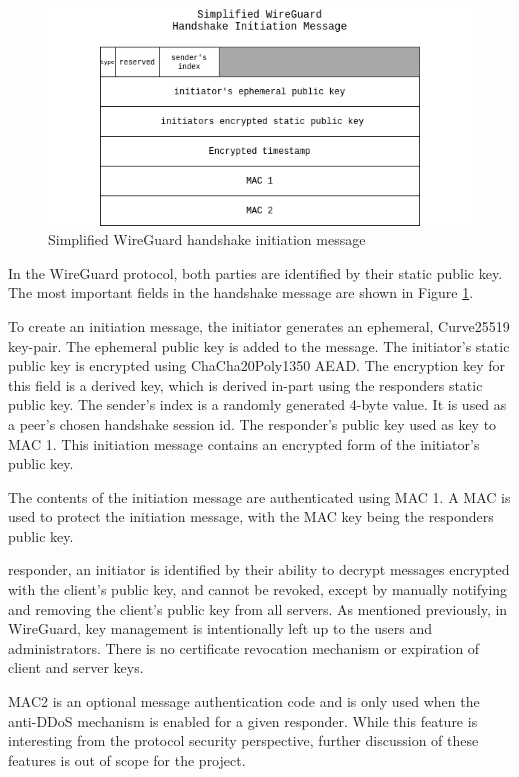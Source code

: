 \documentclass [11pt, proquest] {uwthesis}[2020/02/24]
\begin{document}
\label{handshake_message}

\begin{figure}[ht]
\includegraphics[width=12cm]{paper/images/Wg_hand_init.drawio.png}
\caption{Simplified WireGuard handshake initiation message}
\label{fig:hand_init}
\end{figure}
In the WireGuard protocol, both parties are identified by their static public key.  The most important fields in the handshake message are shown in Figure \ref{fig:hand_init}.

To create an initiation message, the initiator generates an ephemeral, Curve25519 key-pair. The ephemeral public key is added to the message. The initiator's static public key is encrypted using ChaCha20Poly1350 AEAD. The encryption key for this field is a derived key, which is derived in-part using the responders static public key.
The sender's index is a randomly generated 4-byte value. It is used as a peer's chosen handshake session id.
The responder's public key used as key to MAC 1. This initiation message contains an encrypted form of the initiator's public key.

The contents of the initiation message are authenticated using MAC 1.
A MAC is used to protect the initiation message, with the MAC key being the responders public key.

responder, an initiator is identified by their ability to decrypt messages encrypted with the client's public key, and cannot be revoked, except by manually notifying and removing the client’s public key from all servers. As mentioned previously, in WireGuard, key management is intentionally left up to the users and administrators. There is no certificate revocation mechanism or expiration of client and server keys.

MAC2 is an optional message authentication code and is only used when the anti-DDoS mechanism is enabled for a given responder. While this feature is interesting from the protocol security perspective, further discussion of these features is out of scope for the project.
\end{document}
